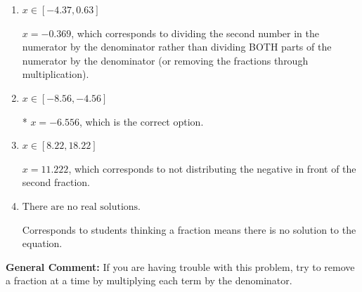 \documentclass{extbook}[14pt]
\begin{document}
\begin{enumerate}
{\begin{enumerate}[label=\Alph*.]
 $x = -11.111$, which corresponds to dividing the coefficients in front of x by the denominator rather than dividing BOTH parts of the numerator by the denominator (or removing the fractions through multiplication).
\item \( x \in [-4.37, 0.63] \)

 $x = -0.369$, which corresponds to dividing the second number in the numerator by the denominator rather than dividing BOTH parts of the numerator by the denominator (or removing the fractions through multiplication).
\item \( x \in [-8.56, -4.56] \)

* $x = -6.556$, which is the correct option.
\item \( x \in [8.22, 18.22] \)

 $x = 11.222$, which corresponds to not distributing the negative in front of the second fraction.
\item \( \text{There are no real solutions.} \)

Corresponds to students thinking a fraction means there is no solution to the equation.
\end{enumerate}

\textbf{General Comment:} If you are having trouble with this problem, try to remove a fraction at a time by multiplying each term by the denominator.
}
\end{enumerate}
\end{document}
